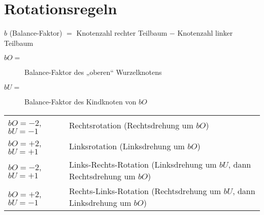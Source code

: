 \documentclass{lehramt-informatik-haupt}
\begin{document}
\begin{multicols}{2}


\columnbreak



\end{multicols}

%

\section{Rotationsregeln}

\begin{center}
$b$ (Balance-Faktor) $=$ Knotenzahl rechter Teilbaum $-$ Knotenzahl linker Teilbaum
\end{center}

\begin{description}
\item[$bO =$] Balance-Faktor des „oberen“ Wurzelknotens
\item[$bU =$] Balance-Faktor des Kindknoten von $bO$
\end{description}

\noindent
\begin{tabular}{l|l}
$bO = -2$, $bU = -1$ &
Rechtsrotation (Rechtsdrehung um $bO$) \\

$bO = +2$, $bU = +1$ &
Linksrotation (Linksdrehung um $bO$) \\

$bO = -2$, $bU = +1$ &
Links-Rechts-Rotation (Linksdrehung um $bU$, dann Rechtsdrehung um $bO$) \\

$bO = +2$, $bU = -1$ &
Rechts-Links-Rotation (Rechtsdrehung um $bU$, dann Linksdrehung um $bO$) \\
\end{tabular}
\end{document}
